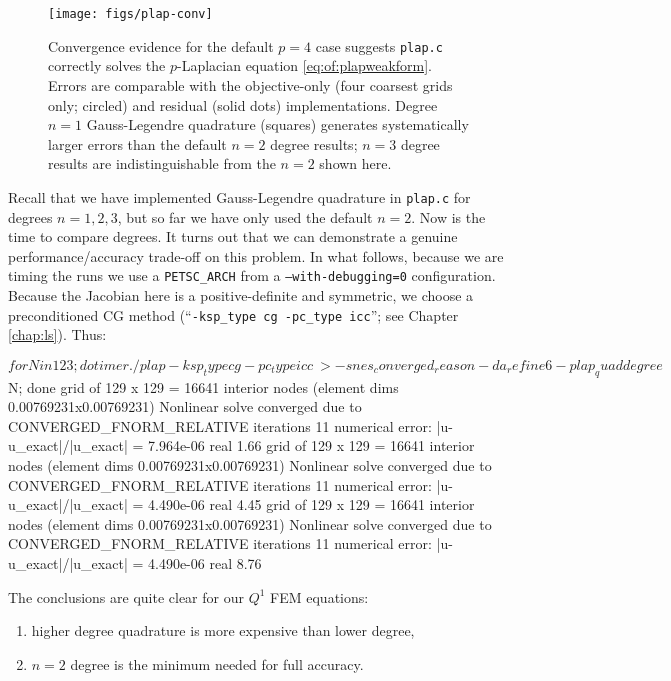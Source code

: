 \begin{figure}
\texttt{[image: figs/plap-conv]}
\caption{Convergence evidence for the default $p=4$ case suggests \texttt{plap.c} correctly solves the $p$-Laplacian equation \eqref{eq:of:plapweakform}.  Errors are comparable with the objective-only (four coarsest grids only; circled) and residual (solid dots) implementations.  Degree $n=1$ Gauss-Legendre quadrature (squares) generates systematically larger errors than the default $n=2$ degree results; $n=3$ degree results are indistinguishable from the $n=2$ shown here.}
\label{fig:of:plap-conv}
\end{figure}

Recall that we have implemented Gauss-Legendre quadrature in \texttt{plap.c} for degrees $n=1,2,3$, but so far we have only used the default $n=2$.  Now is the time to compare degrees.  It turns out that we can demonstrate a genuine performance/accuracy trade-off on this problem.  In what follows, because we are timing the runs we use a \texttt{PETSC\_ARCH} from a \texttt{--with-debugging=0} configuration.  Because the Jacobian here is a positive-definite and symmetric, we choose a preconditioned CG method (``\texttt{-ksp\_type cg -pc\_type icc}''; see Chapter \ref{chap:ls}).  Thus:
\begin{cline}
$ for N in 1 2 3; do timer ./plap -ksp_type cg -pc_type icc \
>   -snes_converged_reason -da_refine 6 -plap_quaddegree $N; done
grid of 129 x 129 = 16641 interior nodes (element dims 0.00769231x0.00769231)
Nonlinear solve converged due to CONVERGED_FNORM_RELATIVE iterations 11
numerical error:  |u-u_exact|/|u_exact| = 7.964e-06
real 1.66
grid of 129 x 129 = 16641 interior nodes (element dims 0.00769231x0.00769231)
Nonlinear solve converged due to CONVERGED_FNORM_RELATIVE iterations 11
numerical error:  |u-u_exact|/|u_exact| = 4.490e-06
real 4.45
grid of 129 x 129 = 16641 interior nodes (element dims 0.00769231x0.00769231)
Nonlinear solve converged due to CONVERGED_FNORM_RELATIVE iterations 11
numerical error:  |u-u_exact|/|u_exact| = 4.490e-06
real 8.76
\end{cline}
The conclusions are quite clear for our $Q^1$ FEM equations:
\renewcommand{\labelenumi}{\emph{(\roman{enumi})}}
\begin{enumerate}
\item higher degree quadrature is more expensive than lower degree,
\item $n=2$ degree is the minimum needed for full accuracy.
\end{enumerate}

